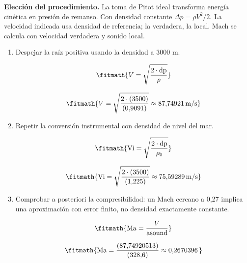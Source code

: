 \noindent\textbf{Elección del procedimiento.} La toma de Pitot ideal transforma energía cinética en presión de remanso. Con densidad constante $\Delta p=\rho V^2/2$. La velocidad indicada usa densidad de referencia; la verdadera, la local. Mach se calcula con velocidad verdadera y sonido local.

\begin{enumerate}

\item Despejar la raíz positiva usando la densidad a 3000 m.

\[\fitmath{V=\sqrt{\frac{2\cdot \mathrm{dp}}{\rho}}}\]

\[\fitmath{V=\sqrt{\frac{2\cdot (3500)}{(0{,}9091)}}\approx 87{,}74921\,\mathrm{m/s}}\]

\item Repetir la conversión instrumental con densidad de nivel del mar.

\[\fitmath{\mathrm{Vi}=\sqrt{\frac{2\cdot \mathrm{dp}}{\rho_{0}}}}\]

\[\fitmath{\mathrm{Vi}=\sqrt{\frac{2\cdot (3500)}{(1{,}225)}}\approx 75{,}59289\,\mathrm{m/s}}\]

\item Comprobar a posteriori la compresibilidad: un Mach cercano a 0,27 implica una aproximación con error finito, no densidad exactamente constante.

\[\fitmath{\mathrm{Ma}=\frac{V}{\mathrm{asound}}}\]

\[\fitmath{\mathrm{Ma}=\frac{(87{,}74920513)}{(328{,}6)}\approx 0{,}2670396\,}\]

\end{enumerate}
